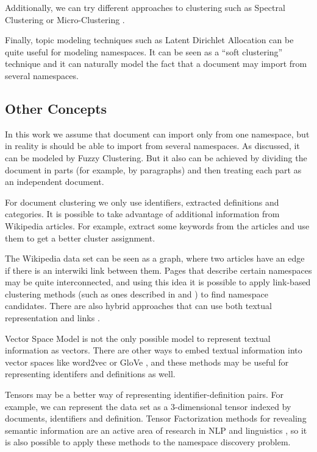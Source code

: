 Additionally, we can try different approaches to clustering such as
Spectral Clustering \cite{ng2002spectral} or Micro-Clustering \cite{uno2015micro}.

Finally, topic modeling techniques such as Latent Dirichlet Allocation
\cite{blei2003latent} can be quite useful for modeling namespaces. It can be
seen as a ``soft clustering'' technique and it can naturally model the fact that
a document may import from several namespaces.


\subsection{Other Concepts} %

In this work we assume that document can import only from one namespace,
but in reality is should be able to import from several namespaces. As discussed,
it can be modeled by Fuzzy Clustering. But it also can be achieved by
dividing the document in parts (for example, by paragraphs)
and then treating each part as an independent document.

For document clustering we only use identifiers, extracted definitions
and categories. It is possible to take advantage of additional information from
Wikipedia articles. For example, extract some keywords from the articles
and use them to get a better cluster assignment.

The Wikipedia data set can be seen as a graph, where two articles have
an edge if there is an interwiki link between them. Pages that describe
certain namespaces may be quite interconnected, and using this idea it is possible
to apply link-based clustering methods (such as ones described in
\cite{botafogo1991identifying} and \cite{johnson1996adaptive}) to find namespace
candidates. There are also hybrid approaches that can use both textual representation
and links \cite{oikonomakou2005review}.

Vector Space Model is not the only possible model to represent textual
information as vectors. There are other ways to embed textual information
into vector spaces like word2vec \cite{mikolov2013efficient} or
GloVe \cite{pennington2014glove}, and these methods may be useful
for representing identifers and definitions as well.

Tensors may be a better way of representing
identifier-definition pairs. For example, we can represent the data set
as a 3-dimensional tensor indexed by documents, identifiers and definition.
Tensor Factorization methods for revealing semantic information
are an active area of research in NLP and linguistics \cite{anisimov2014semantic},
so it is also possible to apply these methods to the namespace discovery problem.

